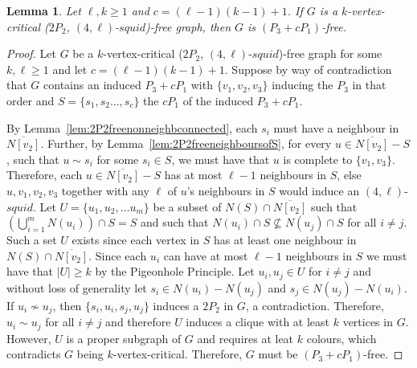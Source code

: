 \documentclass[11pt]{article}
\newtheorem{lemma}[theorem]{Lemma}
\theoremstyle{definition}
\newcommand{\squid}[1]{$(4,#1)$-$squid$}
\begin{document}
\begin{lemma}\label{lem:2P2ellsquidP3cP1fee}
Let $\ell,k\ge 1$ and $c=(\ell-1)(k-1)+1$. If $G$ is a $k$-vertex-critical ($2P_2$, \squid{\ell})-free graph, then $G$ is $(P_3+ cP_1)$-free.
\end{lemma}
\begin{proof}
Let $G$ be a $k$-vertex-critical ($2P_2$, \squid{\ell})-free graph for some $k,\ell\ge 1$ and let $c=(\ell-1)(k-1)+1$. Suppose by way of contradiction that $G$ contains an induced $P_3+c P_1$ with $\{v_1,v_2,v_3\}$ inducing the $P_3$ in that order and $S=\{s_1,s_2\dots, s_c\}$ the $c P_1$ of the induced $P_3+c P_1$. 

By Lemma~\ref{lem:2P2freenonneighbconnected}, each $s_i$ must have a neighbour in $\overline{N[v_2]}$. Further, by Lemma~\ref{lem:2P2freeneighboursofS}, for every $u\in \overline{N[v_2]}-S$, such that $u\sim s_i$ for some $s_i\in S$, we must have that $u$ is complete to $\{v_1,v_3\}$. Therefore, each $u\in \overline{N[v_2]}-S$  has at most $\ell-1$ neighbours in $S$, else $u,v_1,v_2,v_3$ together with any $\ell$ of $u$'s neighbours in $S$ would induce an \squid{\ell}. Let $U=\{u_1,u_2,\dots u_m\}$ be a subset of $N(S)\cap \overline{N[v_2]}$ such that $\left(\bigcup_{i=1}^{m} N(u_i)\right)\cap S = S$ and such that $N(u_i)\cap S\not\subseteq N(u_j)\cap S$ for all $i\neq j$. Such a set $U$ exists since each vertex in $S$ has at least one neighbour in $N(S)\cap \overline{N[v_2]}$. %
Since each $u_i$ can have at most $\ell-1$ neighbours in $S$ we must have that $|U|\ge k$ by the Pigeonhole Principle. Let $u_i,u_j\in U$ for $i\neq j$ and without loss of generality let $s_i\in N(u_i)-N(u_j)$ and $s_j\in N(u_j)-N(u_i)$. If $u_i\nsim u_j$, then $\{s_i,u_i,s_j,u_j\}$ induces a $2P_2$ in $G$, a contradiction. Therefore, $u_i\sim u_j$ for all $i\neq j$ and therefore $U$ induces a clique with at least $k$ vertices in $G$. However, $U$ is a proper subgraph of $G$ and requires at leat $k$ colours, which contradicts $G$ being $k$-vertex-critical. Therefore, $G$ must be $(P_3+ cP_1)$-free.
\end{proof}
\end{document}
